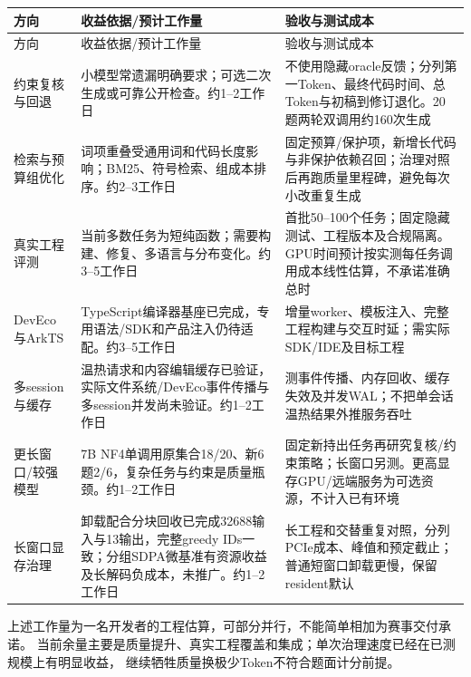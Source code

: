 \documentclass[UTF8,a4paper,11pt,fontset=fandol]{ctexart}
\begin{document}
\begin{longtable}{>{\raggedright\arraybackslash}p{2.6cm}>{\raggedright\arraybackslash}p{5.0cm}>{\raggedright\arraybackslash}p{5.7cm}}
\toprule
方向 & 收益依据/预计工作量 & 验收与测试成本\\\midrule
\endfirsthead
\toprule
方向 & 收益依据/预计工作量 & 验收与测试成本\\\midrule
\endhead
约束复核与回退 & 小模型常遗漏明确要求；可选二次生成或可靠公开检查。约1--2工作日 & 不使用隐藏oracle反馈；分列第一Token、最终代码时间、总Token与初稿到修订退化。20题两轮双调用约160次生成\\
检索与预算组优化 & 词项重叠受通用词和代码长度影响；BM25、符号检索、组成本排序。约2--3工作日 & 固定预算/保护项，新增长代码与非保护依赖召回；治理对照后再跑质量里程碑，避免每次小改重复生成\\
真实工程评测 & 当前多数任务为短纯函数；需要构建、修复、多语言与分布变化。约3--5工作日 & 首批50--100个任务；固定隐藏测试、工程版本及合规隔离。GPU时间预计按实测每任务调用成本线性估算，不承诺准确总时\\
DevEco与ArkTS & TypeScript编译器基座已完成，专用语法/SDK和产品注入仍待适配。约3--5工作日 & 增量worker、模板注入、完整工程构建与交互时延；需实际SDK/IDE及目标工程\\
多session与缓存 & 温热请求和内容编辑缓存已验证，实际文件系统/DevEco事件传播与多session并发尚未验证。约1--2工作日 & 测事件传播、内存回收、缓存失效及并发WAL；不把单会话温热结果外推服务吞吐\\
更长窗口/较强模型 & 7B NF4单调用原集合18/20、新6题2/6，复杂任务与约束是质量瓶颈。约1--2工作日 & 固定新持出任务再研究复核/约束策略；长窗口另测。更高显存GPU/远端服务为可选资源，不计入已有环境\\
长窗口显存治理 & 卸载配合分块回收已完成32688输入与13输出，完整greedy IDs一致；分组SDPA微基准有资源收益及长解码负成本，未推广。约1--2工作日 & 长工程和交替重复对照，分列PCIe成本、峰值和预定截止；普通短窗口卸载更慢，保留resident默认\\
\bottomrule
\end{longtable}

上述工作量为一名开发者的工程估算，可部分并行，不能简单相加为赛事交付承诺。
当前余量主要是质量提升、真实工程覆盖和集成；单次治理速度已经在已测规模上有明显收益，
继续牺牲质量换极少Token不符合题面计分前提。
\end{document}
